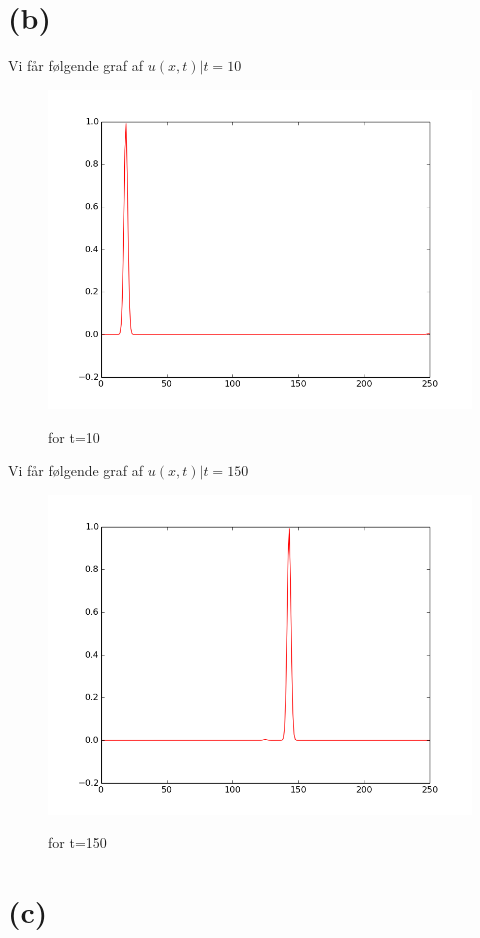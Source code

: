 \documentclass[12pt, a4paper]{article}
\begin{document}
\section*{(b)}
Vi får følgende graf af $u(x,t)|t=10$\\
\begin{figure}[h!]
	\centering
	\includegraphics[scale=0.5]{die_welle2.png}\\
	\caption{for t=10}
\end{figure}
Vi får følgende graf af $u(x,t)|t=150$\\
\begin{figure}[h!]
	\centering
	\includegraphics[scale=0.5]{die_welle3.png}\\
	\caption{for t=150}
\end{figure}\section*{(c)}
\end{document}
